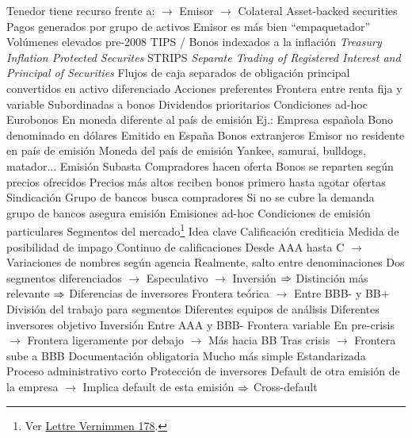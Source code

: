 \documentclass{nuevotema}
\begin{document}
\begin{esquemal}
				\4 Tenedor tiene recurso frente a:
				\4[] $\to$ Emisor
				\4[] $\to$ Colateral
			\3 Asset-backed securities
				\4 Pagos generados por grupo de activos
				\4 Emisor es más bien ``empaquetador''
				\4 Volúmenes elevados pre-2008
			\3 TIPS / Bonos indexados a la inflación
				\4 \textit{Treasury Inflation Protected Securites}
			\3 STRIPS
				\4 \textit{Separate Trading of Registered Interest and Principal of Securities}
				\4 Flujos de caja separados de obligación principal
				\4[] convertidos en activo diferenciado
			\3 Acciones preferentes
				\4 Frontera entre renta fija y variable
				\4 Subordinadas a bonos
				\4 Dividendos prioritarios
				\4 Condiciones ad-hoc
			\3 Eurobonos
				\4 En moneda diferente al país de emisión
				\4 Ej.:
				\4[] Empresa española
				\4[] Bono denominado en dólares
				\4[] Emitido en España
			\3 Bonos extranjeros
				\4 Emisor no residente en país de emisión
				\4 Moneda del país de emisión
				\4 Yankee, samurai, bulldogs, matador...
		\2 Emisión
			\3 Subasta
				\4 Compradores hacen oferta
				\4 Bonos se reparten según precios ofrecidos
				\4 Precios más altos reciben bonos primero
				\4 [] hasta agotar ofertas
			\3 Sindicación
				\4 Grupo de bancos busca compradores
				\4 Si no se cubre la demanda
				\4[] grupo de bancos asegura emisión
			\3 Emisiones ad-hoc
				\4 Condiciones de emisión particulares
		\2 Segmentos del mercado\footnote{Ver \href{https://www.vernimmen.net/Lire/Lettre_Vernimmen/Lettre_178.html}{Lettre Vernimmen 178}.}
			\3 Idea clave
				\4 Calificación crediticia
				\4[] Medida de posibilidad de impago
				\4 Continuo de calificaciones
				\4[] Desde AAA hasta C
				\4[] $\to$ Variaciones de nombres según agencia
				\4 Realmente, salto entre denominaciones
				\4[] Dos segmentos diferenciados
				\4[] $\to$ Especulativo
				\4[] $\to$ Inversión
				\4[] $\Rightarrow$ Distinción más relevante
				\4[] $\Rightarrow$ Diferencias de inversores
				\4[] Frontera teórica
				\4[] $\to$ Entre BBB- y BB+
				\4 División del trabajo para segmentos
				\4[] Diferentes equipos de análisis
				\4[] Diferentes inversores objetivo
			\3 Inversión
				\4 Entre AAA y BBB-
				\4[] Frontera variable
				\4[] En pre-crisis
				\4[] $\to$ Frontera ligeramente por debajo
				\4[] $\to$ Más hacia BB
				\4[] Tras crisis
				\4[] $\to$ Frontera sube a BBB
				\4 Documentación obligatoria
				\4[] Mucho más simple
				\4[] Estandarizada
				\4[] Proceso administrativo corto
				\4 Protección de inversores
				\4[] Default de otra emisión de la empresa
				\4[] $\to$ Implica default de esta emisión
				\4[] $\Rightarrow$ Cross-default

\end{esquemal}
\end{document}
